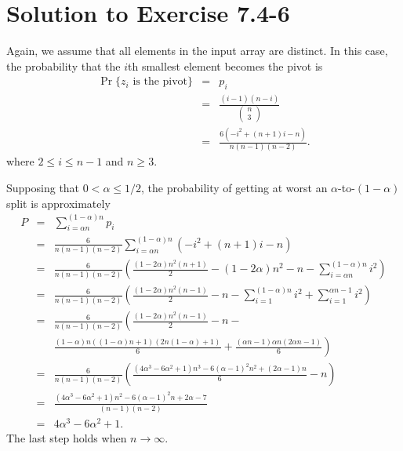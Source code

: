 \documentclass[a4paper, fleqn]{article}
\begin{document}
\section*{Solution to Exercise 7.4-6}
Again, we assume that all elements in the input array are distinct. In this case, 
the probability that the $i$th smallest element becomes the pivot is
\begin{eqnarray*}
\Pr\{z_i \mbox{ is the pivot}\} & = & p_i \\
& = & \frac{(i - 1)(n - i)}{\left(\!\begin{array}{c}n \\ 3\end{array}\!\right)} \\
& = & \frac{6(-i^2 + (n + 1)i - n)}{n(n - 1)(n - 2)}.
\end{eqnarray*}
where $2 \leq i \leq n - 1$ and $n \geq 3$.

Supposing that $0 < \alpha \leq 1/2$, the probability of getting at worst an 
$\alpha$-to-$(1 - \alpha)$ split is approximately
\begin{eqnarray*}
P & = & \sum_{i = \alpha n}^{(1 - \alpha)n} p_i \\
  & = & \frac{6}{n(n - 1)(n - 2)} \sum_{i = \alpha n}^{(1 - \alpha)n} (-i^2 + (n + 1)i - n) \\
  & = & \frac{6}{n(n - 1)(n - 2)} \left(\frac{(1 - 2\alpha)n^2(n+1)}{2} - (1 - 2\alpha)n^2 - n - \sum_{i = \alpha n}^{(1 - \alpha)n} i^2 \right) \\
  & = & \frac{6}{n(n - 1)(n - 2)} \left(\frac{(1 - 2\alpha)n^2(n-1)}{2} - n - \sum_{i=1}^{(1-\alpha)n} i^2 + \sum_{i=1}^{\alpha n - 1} i^2 \right) \\
  & = & \frac{6}{n(n - 1)(n - 2)} \left(\frac{(1 - 2\alpha)n^2(n-1)}{2} - n - \right. \\
  &   & \left. \frac{(1-\alpha)n((1-\alpha)n + 1)(2n(1-\alpha) + 1)}{6} + \frac{(\alpha n - 1)\alpha n(2\alpha n - 1)}{6} \right) \\
  & = & \frac{6}{n(n - 1)(n - 2)} \left( \frac{(4\alpha^3 - 6\alpha^2 + 1)n^3 - 6(\alpha - 1)^2 n^2 + (2\alpha - 1)n}{6} - n \right) \\
  & = & \frac{(4\alpha^3 - 6\alpha^2 + 1)n^2 - 6(\alpha - 1)^2 n + 2\alpha - 7}{(n - 1)(n - 2)} \\
  & = & 4\alpha^3 - 6\alpha^2 + 1.
\end{eqnarray*}
The last step holds when $n \rightarrow \infty$.
\end{document}
